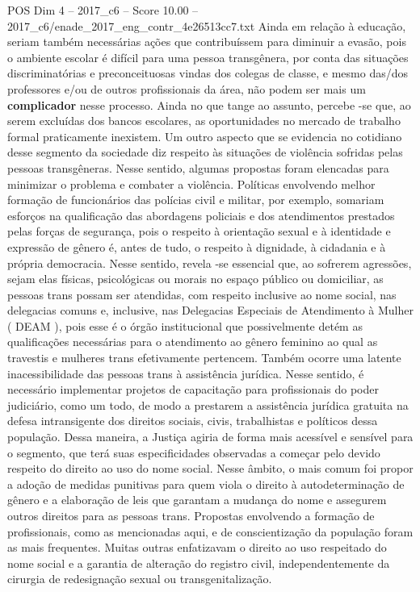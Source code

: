 \begin{textsample}{POS Dim 4 – 2017\_c6 – Score 10.00 – 2017\_c6/enade\_2017\_eng\_contr\_4e26513cc7.txt}
Ainda em relação à educação, seriam também necessárias ações que contribuíssem para diminuir a evasão, pois o ambiente escolar é difícil para uma pessoa transgênera, por conta das situações discriminatórias e preconceituosas vindas dos colegas de classe, e mesmo das/dos professores e/ou de outros profissionais da área, não podem ser mais um \textbf{complicador} nesse processo.
Ainda no que tange ao assunto, percebe -se que, ao serem excluídas dos bancos escolares, as oportunidades no mercado de trabalho formal praticamente inexistem.
Um outro aspecto que se evidencia no cotidiano desse segmento da sociedade diz respeito às situações de violência sofridas pelas pessoas transgêneras.
Nesse sentido, algumas propostas foram elencadas para minimizar o problema e combater a violência.
Políticas envolvendo melhor formação de funcionários das polícias civil e militar, por exemplo, somariam esforços na qualificação das abordagens policiais e dos atendimentos prestados pelas forças de segurança, pois o respeito à orientação sexual e à identidade e expressão de gênero é, antes de tudo, o respeito à dignidade, à cidadania e à própria democracia.
Nesse sentido, revela -se essencial que, ao sofrerem agressões, sejam elas físicas, psicológicas ou morais no espaço público ou domiciliar, as pessoas trans possam ser atendidas, com respeito inclusive ao nome social, nas delegacias comuns e, inclusive, nas Delegacias Especiais de Atendimento à Mulher ( DEAM ), pois esse é o órgão institucional que possivelmente detém as qualificações necessárias para o atendimento ao gênero feminino ao qual as travestis e mulheres trans efetivamente pertencem.
Também ocorre uma latente inacessibilidade das pessoas trans à assistência jurídica.
Nesse sentido, é necessário implementar projetos de capacitação para profissionais do poder judiciário, como um todo, de modo a prestarem a assistência jurídica gratuita na defesa intransigente dos direitos sociais, civis, trabalhistas e políticos dessa população.
Dessa maneira, a Justiça agiria de forma mais acessível e sensível para o segmento, que terá suas especificidades observadas a começar pelo devido respeito do direito ao uso do nome social.
Nesse âmbito, o mais comum foi propor a adoção de medidas punitivas para quem viola o direito à autodeterminação de gênero e a elaboração de leis que garantam a mudança do nome e assegurem outros direitos para as pessoas trans.
Propostas envolvendo a formação de profissionais, como as mencionadas aqui, e de conscientização da população foram as mais frequentes.
Muitas outras enfatizavam o direito ao uso respeitado do nome social e a garantia de alteração do registro civil, independentemente da cirurgia de redesignação sexual ou transgenitalização.

\end{textsample}
